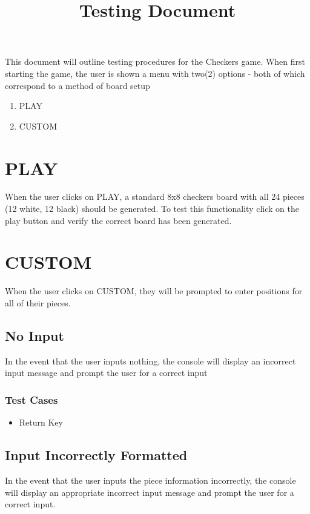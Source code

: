 \documentclass{article}
\title{Testing Document}
\date{\vspace{-5ex}}
\begin{document}
\maketitle

This document will outline testing procedures for the Checkers game. When first starting the game, the user is shown a menu with two(2) options - both of which correspond to a method of board setup 
\begin{enumerate}
\item PLAY
\item CUSTOM
\end{enumerate}

\section{PLAY}
When the user clicks on PLAY, a standard 8x8 checkers board with all 24 pieces (12 white, 12 black) should be generated.
To test this functionality click on the play button and verify the correct board has been generated.

\section{CUSTOM}
When the user clicks on CUSTOM, they will be prompted to enter positions for all of their pieces.

\subsection{No Input}
In the event that the user inputs nothing, the console will display an incorrect input message and prompt the user for a correct input

\subsubsection{Test Cases}
\begin{itemize}
\item Return Key
\end{itemize}

\subsection{Input Incorrectly Formatted}
In the event that the user inputs the piece information incorrectly, the console will display an appropriate incorrect input message and prompt the user for a correct input. 
\end{document}
